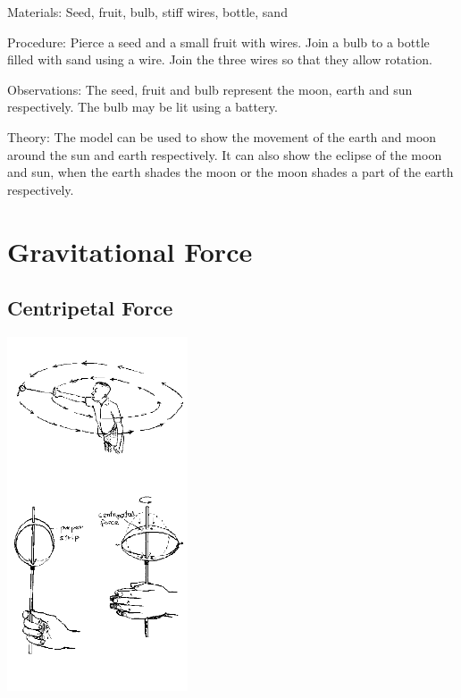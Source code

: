 \begin{multicols}{2}
\begin{description*}
\item[Materials:]{Seed, fruit, bulb, stiff wires, bottle, sand}
\item[Procedure:]{Pierce a seed and a small fruit with wires. Join a bulb to a bottle filled with sand using a wire. Join the three wires so that they allow rotation.}
\item[Observations:]{The seed, fruit and bulb represent the moon, earth and sun respectively. The bulb may be lit using a battery.}
\item[Theory:]{The model can be used to show the movement of the earth and moon around the sun and earth respectively. It can also show the eclipse of the moon and sun, when the earth shades the moon or the moon shades a part of the earth respectively.}
\end{description*}


\section*{Gravitational Force}  


\subsection{Centripetal Force}

\begin{center}
\includegraphics[width=0.4\textwidth]{./img/source/centripetal-force.png}
\end{center}


\end{multicols}
